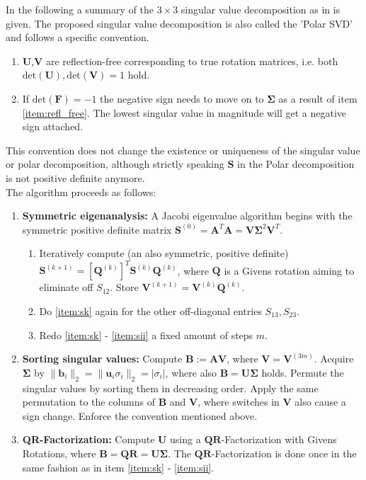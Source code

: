 \documentclass[m,times]{cgMA}
\begin{document}
In the following a summary of the $3 \times 3$ singular value decomposition as in \cite{SVD:3x3} is given. The proposed singular value decomposition is also called the 'Polar SVD' and follows a specific convention.
\begin{enumerate}\label{ref:itemize_conv}
  \item\label{item:refl_free} $\boldsymbol{U}$,$\boldsymbol{V}$ are reflection-free corresponding to true rotation matrices, i.e. both $\text{det}(\boldsymbol{U}), \text{det}(\boldsymbol{V}) = 1$ hold.
  \item If $\text{det}(\boldsymbol{F}) = -1$ the negative sign needs to move on to $\boldsymbol{\Sigma}$ as a result of item \ref{item:refl_free}. The lowest singular value in magnitude will get a negative sign attached.
  \end{enumerate}
This convention does not change the existence or uniqueness of the singular value or polar decomposition, although strictly speaking $\boldsymbol{S}$ in the Polar decomposition is not positive definite anymore.
\\
The algorithm proceeds as follows:
\begin{enumerate}
  \item \label{it:eig} \textbf{Symmetric eigenanalysis:} A Jacobi eigenvalue algorithm begins with the symmetric positive definite matrix $\boldsymbol { S } ^{(0)}= \boldsymbol { A } ^ { T } \boldsymbol { A } = \boldsymbol { V } \boldsymbol { \Sigma } ^ { 2 } \boldsymbol { V } ^ { T }$.
    \begin{enumerate}[label*=\arabic*.]
      \item \label{item:sk} Iteratively compute (an also symmetric, positive definite) $\boldsymbol { S } ^ { ( k + 1 ) } = [ \boldsymbol { Q } ^ { ( k )}] ^ { T } \boldsymbol { S } ^ { ( k ) } \boldsymbol { Q } ^ { ( k ) }$, where $\boldsymbol{Q}$ is a Givens rotation aiming to eliminate off $S_{12}$. Store $\boldsymbol{V}^{(k+1)} = \boldsymbol{V}^{(k)}  \boldsymbol{Q}^{(k)}$.
      \item \label{item:sii} Do \ref{item:sk} again for the other off-diagonal entries $S_{13},S_{23}$.
      \item \label{item:redo_sii} Redo \ref{item:sk} - \ref{item:sii} a fixed amount of steps $m$.
    \end{enumerate}
  \item \textbf{Sorting singular values:} Compute $\boldsymbol{B} := \boldsymbol{AV}$, where $\boldsymbol{V} = \boldsymbol{V}^{(3m)}$. Acquire $\boldsymbol{\Sigma}$ by $\|\boldsymbol{b}_i \|_2 = \|\boldsymbol{u}_i\sigma_i\|_2 = |\sigma_i|$, where also $\boldsymbol{B=U\Sigma}$ holds. Permute the singular values by sorting them in decreasing order. Apply the same permutation to the columns of $\boldsymbol{B}$ and $\boldsymbol{V}$, where switches in $\boldsymbol{V}$ also cause a sign change. Enforce the convention mentioned above.
  \item \label{item:qr} \textbf{QR-Factorization:} Compute $\boldsymbol{U}$ using a $\boldsymbol{QR}$-Factorization with Givens Rotations, where $\boldsymbol{B}=\boldsymbol{QR}=\boldsymbol{U\Sigma}$. The $\boldsymbol{QR}$-Factorization is done once in the same fashion as in item \ref{item:sk} - \ref{item:sii}.
\end{enumerate}
\end{document}

